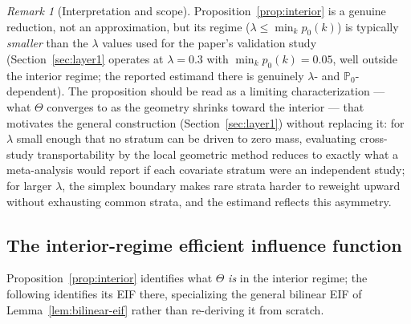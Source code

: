 \documentclass[11pt]{article}
\theoremstyle{plain}
\theoremstyle{definition}
\theoremstyle{remark}
\newtheorem{remark}[theorem]{Remark}
\newcommand{\PP}{\mathbb{P}}
\begin{document}
\begin{remark}[Interpretation and scope]\label{rem:interior-scope}
Proposition~\ref{prop:interior} is a genuine reduction, not an approximation, but its
regime ($\lambda\le\min_kp_0(k)$) is typically \emph{smaller} than the $\lambda$
values used for the paper's validation study (Section~\ref{sec:layer1} operates at
$\lambda=0.3$ with $\min_k p_0(k)=0.05$, well outside the interior regime; the
reported estimand there is genuinely $\lambda$- and $\PP_0$-dependent). The
proposition should be read as a limiting characterization --- what $\Theta$ converges
to as the geometry shrinks toward the interior --- that motivates the general
construction (Section~\ref{sec:layer1}) without replacing it: for $\lambda$ small
enough that no stratum can be driven to zero mass, evaluating cross-study
transportability by the local geometric method reduces to exactly what a
meta-analysis would report if each covariate stratum were an independent study; for
larger $\lambda$, the simplex boundary makes rare strata harder to reweight upward
without exhausting common strata, and the estimand reflects this asymmetry.
\end{remark}

\subsection{The interior-regime efficient influence function}\label{sec:interior-eif}

Proposition~\ref{prop:interior} identifies what $\Theta$ \emph{is} in the interior
regime; the following identifies its EIF there, specializing the general bilinear
EIF of Lemma~\ref{lem:bilinear-eif} rather than re-deriving it from scratch.
\end{document}
